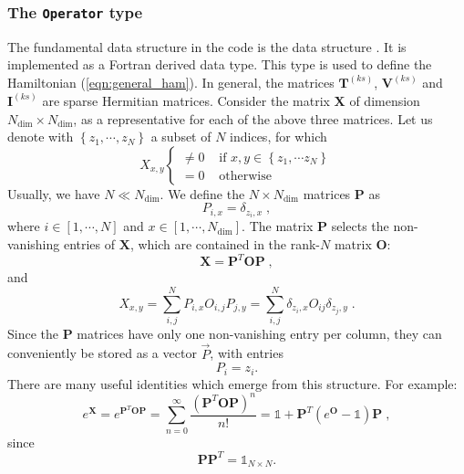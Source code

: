 \documentclass{SciPost}
\begin{document}
\subsubsection{The \texttt{Operator} type}\label{sec:op}
%
The fundamental data structure in the code is the data structure . It is implemented as a Fortran derived data type.
This type is used to define the Hamiltonian (\ref{eqn:general_ham}).
In general, the matrices $\textbf{T}^{(ks)}$, $\textbf{V}^{(ks)}$ and $\textbf{I}^{(ks)}$ are sparse Hermitian matrices.
Consider the  matrix   ${\bm X}$ of dimension  $N_{\mathrm{dim}} \times N_{\mathrm{dim}}$, as a representative for each of the above three matrices. 
Let us  denote  with  $ \left\{z_{1},\cdots,  z_{N}  \right\}$  a subset  of $N$ indices,
for which
\begin{equation}
X_{x,y} 
\left\{\begin{matrix}  \neq 0  &  \text{ if }   x,  y  \in \left\{ z_1, \cdots z_N \right\}\\ 
                                 = 0         &  \text{ otherwise } 
      \end{matrix}\right.
\end{equation}
Usually, we have $N\ll N_{\text{dim}}$.
 We define the $N \times N_{\mathrm{dim}}$ matrices $\mathbf{P}$  as
\begin{equation}
P_{i,x}=\delta_{z_{i},x}\;,
\end{equation}
where $i \in [1,\cdots, N ]$ and $ x  \in [1,\cdots, N_{\mathrm{dim}}]$. The matrix  $\bm{P}$ selects the non-vanishing entries of $\bm{X}$, 
which are contained in the rank-$N$  matrix $\bm{O}$:
\begin{equation}\label{eqn:xeqpdop}
\bm{X} =\bm{P}^{T} \bm{O} \bm{P}\;,
\end{equation}
and 
\begin{equation}
X_{x,y} = \sum\limits_{i,j}^{N}  P_{i,x}  O_{i,j} P_{j,y}=\sum\limits_{i,j}^{N} \delta_{z_{i},x}  O_{ij} \delta_{z_{j},y} \;.
\end{equation}
Since  the  $\bm{P}$ matrices have only one non-vanishing entry per column,  they can conveniently be stored as a vector $\vec{P}$, with entries
\begin{equation}
     P_i = z_i.
\end{equation}  
There are  many useful  identities which emerge from this  structure. For example: 
\begin{equation}
	e^{\bm{X}} =  e^{\bm{P}^{T} \bm{O} \bm{P}}   = \sum_{n=0}^{\infty}  \frac{\left( \bm{P}^{T} \bm{O} \bm{P} \right)^n}{n!} = \mathds{1}+ \bm{P}^{T} \left(e^{ \bm{O} }-\mathds{1} \right) \bm{P}\;,
\end{equation}
since 
\begin{equation} 
	 \bm{P} \bm{P}^{T}= \mathds{1}_{N\times N}.
\end{equation}
\end{document}
